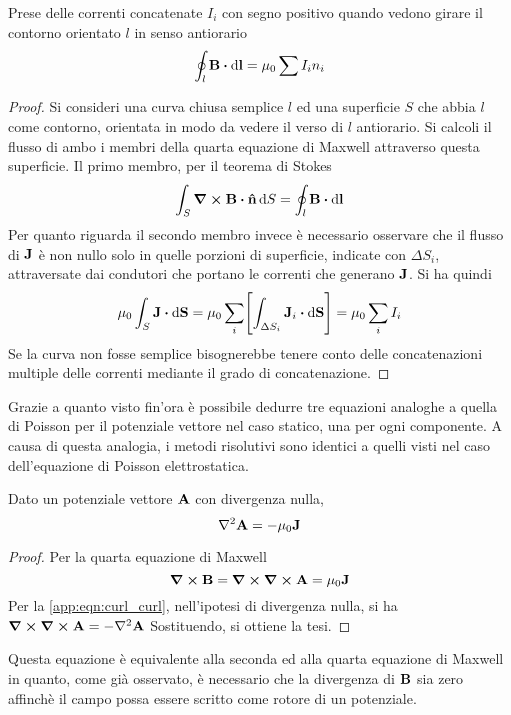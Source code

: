 \begin{cor}
    Prese delle correnti concatenate $I_i$ con segno positivo quando vedono girare il contorno orientato $l$ in senso antiorario
    \begin{equation}
        \oint_l \vb{B}\vdot\dd{\vb{l}}=\mu_0 \sum I_i n_i
    \end{equation}
    \label{teo:Ampère}
\end{cor}
\begin{proof}
    Si consideri una curva chiusa semplice $l$ ed una superficie $S$ che abbia $l$ come contorno,
    orientata in modo da vedere il verso di $l$ antiorario. Si calcoli il flusso di ambo i membri
    della quarta equazione di Maxwell attraverso questa superficie.
    Il primo membro, per il teorema di Stokes
    \[
        \int_S \curl{\vb{B}}\vdot\vu{n}\dd{S}=\oint_l\vb{B}\vdot\dd{\vb{l}}
    \]
    Per quanto riguarda il secondo membro invece è necessario osservare che il flusso di $\vb{J}$ è non nullo
    solo in quelle porzioni di superficie, indicate con $\Delta S_i$, attraversate dai condutori
    che portano le correnti che generano $\vb{J}$. Si ha quindi
    \[
        \mu_0 \int_S \vb{J}\vdot\dd{\vb{S}}=\mu_0 \sum_i \Biggl[\int_{\Delta S_i} \vb{J}_i \vdot\dd{\vb{S}} \Biggr]=\mu_0 \sum_i I_i
    \]
    Se la curva non fosse semplice bisognerebbe tenere conto delle concatenazioni multiple delle correnti mediante il grado di concatenazione.
\end{proof}

Grazie a quanto visto fin'ora è possibile dedurre tre equazioni analoghe a quella di Poisson
per il potenziale vettore nel caso statico, una per ogni componente. A causa di questa analogia,
i metodi risolutivi sono identici a quelli visti nel caso dell'equazione di Poisson elettrostatica.
\begin{thm}
    Dato un potenziale vettore $\vb{A}$ con divergenza nulla,
    \begin{equation}
        \laplacian \vb{A}=-\mu_0\vb{J}
    \end{equation}
\end{thm}
\begin{proof}
    Per la quarta equazione di Maxwell
    \[
        \curl{\vb{B}}=\curl\curl{\vb{A}}=\mu_0\vb{J}
    \]
    Per la \eqref{app:eqn:curl_curl}, nell'ipotesi di divergenza nulla, si ha $\curl\curl{\vb{A}}=-\laplacian{\vb{A}}$
    Sostituendo, si ottiene la tesi.
\end{proof}
Questa equazione è equivalente alla seconda ed alla quarta equazione di Maxwell in quanto, come già osservato,
è necessario che la divergenza di $\vb{B}$ sia zero affinchè il campo possa essere scritto come rotore di
un potenziale.

